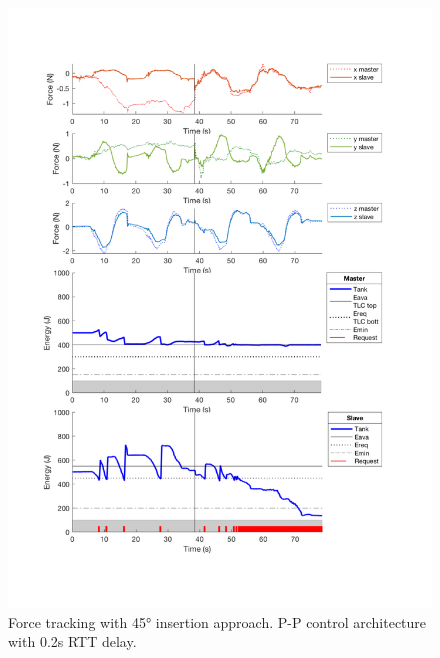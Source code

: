 \begin{center}
	\begin{figure}
		\includegraphics[width=\textwidth, keepaspectratio]{plots/pp90Delay/Force.pdf}
		\caption{Force tracking with 45° insertion approach. P-P control architecture with 0.2s RTT delay.}
		\label{graph:pp45Delay/Force}
	\end{figure}
\end{center}
\newpage
